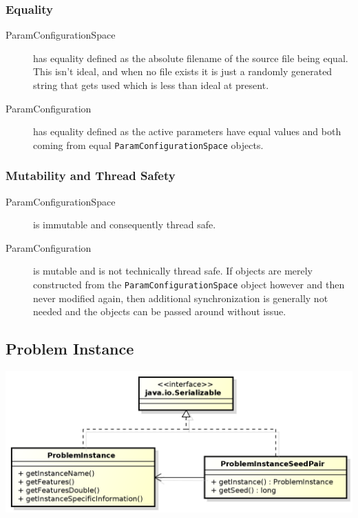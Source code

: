 \documentclass[11pt,letterpaper,oneside]{article}
\begin{document}
\subsubsection{Equality}
\begin{description}
\item[ParamConfigurationSpace] has equality defined as the absolute filename of the source file being equal. This isn't ideal, and when no file exists it is just a randomly generated string that gets used which is less than ideal at present.
\item[ParamConfiguration] has equality defined as the active parameters have equal values and both coming from equal \texttt{ParamConfigurationSpace} objects.
\end{description}

\subsubsection{Mutability and Thread Safety}

\begin{description}
\item[ParamConfigurationSpace] is immutable and consequently thread safe.
\item[ParamConfiguration] is mutable and is not technically thread safe. If objects are merely constructed from the \texttt{ParamConfigurationSpace} object however and then never modified again, then additional synchronization is generally not needed and the objects can be passed around without issue. 
\end{description}




\subsection{Problem Instance}


\begin{center}
\includegraphics[scale=0.75]{img/UML/pi.png}
\end{center}
\end{document}
